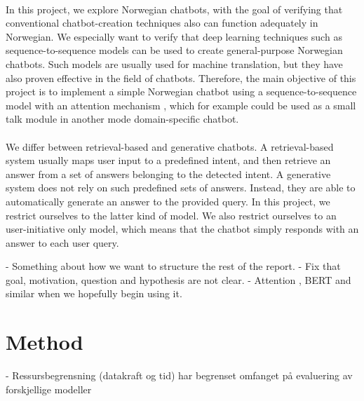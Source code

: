 \documentclass{article}
\begin{document}
\paragraph{}
In this project, we explore Norwegian chatbots, with the goal of verifying that
conventional chatbot-creation techniques also can function adequately in
Norwegian. We especially want to verify that deep learning techniques such as
sequence-to-sequence models \cite{Cho2014} can be used to create
general-purpose Norwegian chatbots. Such models are usually used for machine
translation, but they have also proven effective in the field of chatbots.
Therefore, the main objective of this project is to implement a simple Norwegian
chatbot using a sequence-to-sequence model with an attention mechanism
\cite{Bahdanau2015}, which for example could be used as a small talk module in
another mode domain-specific chatbot.

\paragraph{}
We differ between retrieval-based and generative chatbots. A retrieval-based
system usually maps user input to a predefined intent, and then retrieve an
answer from a set of answers belonging to the detected intent. A generative
system does not rely on such predefined sets of answers.  Instead, they are
able to automatically generate an answer to the provided query. In this
project, we restrict ourselves to the latter kind of model. We also restrict
ourselves to an user-initiative only model, which means that the chatbot simply
responds with an answer to each user query.

\if
- Something about how we want to structure the rest of the report.  
- Fix that goal, motivation, question and hypothesis are not clear.  
- Attention \cite{Bahdanau2015}, BERT and similar when we hopefully begin using it.
\fi

\section*{Method}
\if
 - Ressursbegrensning (datakraft og tid) har begrenset omfanget på evaluering
 av forskjellige modeller
\fi
\end{document}
